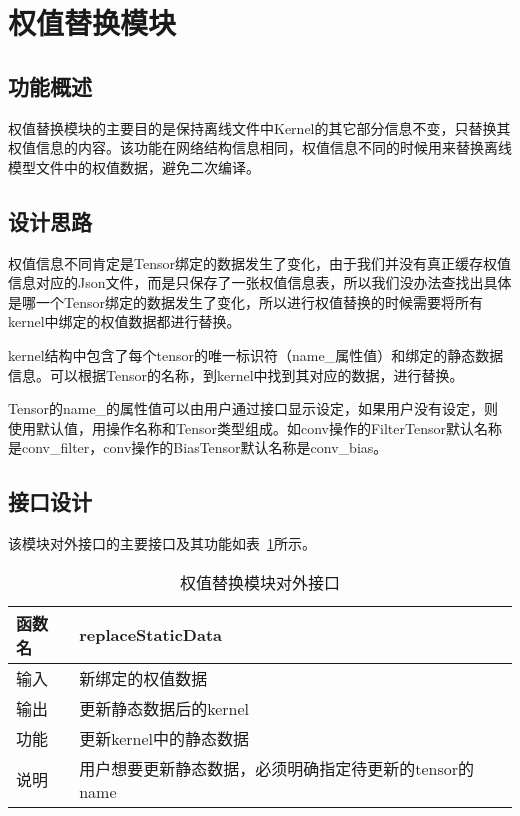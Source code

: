 \section {权值替换模块}

\subsection {功能概述}

权值替换模块的主要目的是保持离线文件中Kernel的其它部分信息不变，只替换其权值信息的内容。该功能在网络结构信息相同，权值信息不同的时候用来替换离线模型文件中的权值数据，避免二次编译。

\subsection {设计思路}

权值信息不同肯定是Tensor绑定的数据发生了变化，由于我们并没有真正缓存权值信息对应的Json文件，而是只保存了一张权值信息表，所以我们没办法查找出具体是哪一个Tensor绑定的数据发生了变化，所以进行权值替换的时候需要将所有kernel中绑定的权值数据都进行替换。

kernel结构中包含了每个tensor的唯一标识符（name\_属性值）和绑定的静态数据信息。可以根据Tensor的名称，到kernel中找到其对应的数据，进行替换。

Tensor的name\_的属性值可以由用户通过接口显示设定，如果用户没有设定，则使用默认值，用操作名称和Tensor类型组成。如conv操作的FilterTensor默认名称是conv\_filter，conv操作的BiasTensor默认名称是conv\_bias。

\subsection {接口设计}
该模块对外接口的主要接口及其功能如表~\ref{tab:weight-replace}所示。

\begin{table}[htb]
  \centering\small
  \caption{权值替换模块对外接口}
  \label{tab:weight-replace}
  \begin{tabular}{ll}
    \toprule
    函数名       & replaceStaticData   \\
    \midrule
    输入 & 新绑定的权值数据 \\
    输出 & 更新静态数据后的kernel \\
    功能 & 更新kernel中的静态数据  \\
    说明 & 用户想要更新静态数据，必须明确指定待更新的tensor的name \\
    \bottomrule
  \end{tabular}
\end{table}

